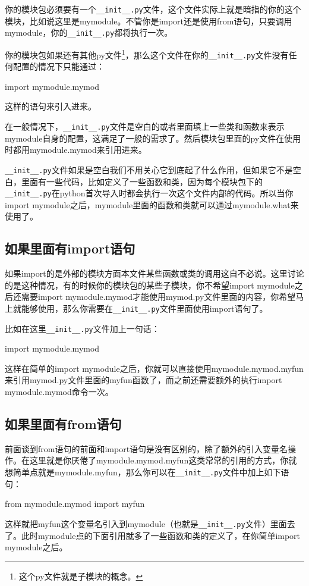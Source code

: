 \documentclass[12pt,oneside]{book}
\begin{document}
\begin{common-format}
你的模块包必须要有一个\verb+__init__.py+文件，这个文件实际上就是暗指的你的这个模块，比如说这里是mymodule。不管你是import还是使用from语句，只要调用mymodule，你的\verb+__init__.py+都将执行一次。

你的模块包如果还有其他py文件\footnote{这个py文件就是子模块的概念。}，那么这个文件在你的\verb+__init__.py+文件没有任何配置的情况下只能通过：
\begin{tcbpython}[]
import mymodule.mymod
\end{tcbpython}
这样的语句来引入进来。

在一般情况下，\verb+__init__.py+文件是空白的或者里面填上一些类和函数来表示mymodule自身的配置，这满足了一般的需求了。然后模块包里面的py文件在使用时都用mymodule.mymod来引用进来。

\verb+__init__.py+文件如果是空白我们不用关心它到底起了什么作用，但如果它不是空白，里面有一些代码，比如定义了一些函数和类，因为每个模块包下的\verb+__init__.py+在python首次导入时都会执行一次这个文件内部的代码。所以当你import mymodule之后，mymodule里面的函数和类就可以通过mymodule.what来使用了。

\subsection{如果里面有import语句}
如果import的是外部的模块方面本文件某些函数或类的调用这自不必说。这里讨论的是这种情况，有的时候你的模块包的某些子模块，你不希望import mymodule之后还需要import mymodule.mymod才能使用mymod.py文件里面的内容，你希望马上就能够使用，那么你需要在\verb+__init__.py+文件里面使用import语句了。

比如在这里\verb+__init__.py+文件加上一句话：
\begin{tcbpython}
import mymodule.mymod
\end{tcbpython}

这样在简单的import mymodule之后，你就可以直接使用mymodule.mymod.myfun来引用mymod.py文件里面的myfun函数了，而之前还需要额外的执行import mymodule.mymod命令一次。


\subsection{如果里面有from语句}
前面谈到from语句的前面和import语句是没有区别的，除了额外的引入变量名操作。在这里就是你厌倦了mymodule.mymod.myfun这类常常的引用的方式，你就想简单点就是mymodule.myfun，那么你可以在\verb+__init__.py+文件中加上如下语句：
\begin{tcbpython}[]
from mymodule.mymod import myfun
\end{tcbpython}
这样就把myfun这个变量名引入到mymodule（也就是\verb+__init__.py+文件）里面去了。此时mymodule点的下面引用就多了一些函数和类的定义了，在你简单import mymodule之后。


\end{common-format}
\end{document}
